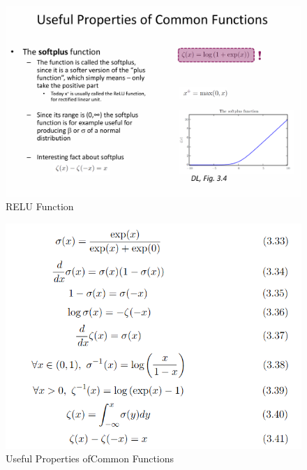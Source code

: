 \documentclass[../Main.tex]{subfiles}
\begin{document}
\begin{figure}[H]
    \centering
    \includegraphics[width=1\linewidth]{Images/relu.png}
    \caption{RELU Function}
\end{figure}

\begin{figure}[H]
    \centering
    \includegraphics[width=1\linewidth]{Images/comm-useful-props.png}
    \caption{Useful Properties ofCommon Functions}
\end{figure}
\end{document}
